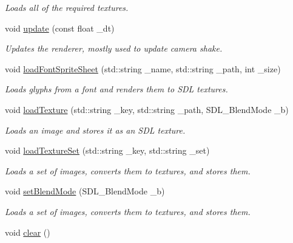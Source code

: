 \begin{DoxyCompactItemize}
\begin{DoxyCompactList}\small\item\em Loads all of the required textures. \end{DoxyCompactList}\item 
void \hyperlink{classrenderer_ad06ba9c15401bb0dcdafb525cfd8f201}{update} (const float \-\_\-dt)
\begin{DoxyCompactList}\small\item\em Updates the renderer, mostly used to update camera shake. \end{DoxyCompactList}\item 
void \hyperlink{classrenderer_abab0176fc41988510f7602da75e885fc}{load\-Font\-Sprite\-Sheet} (std\-::string \-\_\-name, std\-::string \-\_\-path, int \-\_\-size)
\begin{DoxyCompactList}\small\item\em Loads glyphs from a font and renders them to S\-D\-L textures. \end{DoxyCompactList}\item 
void \hyperlink{classrenderer_a56924d177465861dc6273e6ff5de220d}{load\-Texture} (std\-::string \-\_\-key, std\-::string \-\_\-path, S\-D\-L\-\_\-\-Blend\-Mode \-\_\-b)
\begin{DoxyCompactList}\small\item\em Loads an image and stores it as an S\-D\-L texture. \end{DoxyCompactList}\item 
void \hyperlink{classrenderer_acc26e337a27867cfc52193774986ff7c}{load\-Texture\-Set} (std\-::string \-\_\-key, std\-::string \-\_\-set)
\begin{DoxyCompactList}\small\item\em Loads a set of images, converts them to textures, and stores them. \end{DoxyCompactList}\item 
void \hyperlink{classrenderer_a9355f220b4ea6a7a528913b6878bded2}{set\-Blend\-Mode} (S\-D\-L\-\_\-\-Blend\-Mode \-\_\-b)
\begin{DoxyCompactList}\small\item\em Loads a set of images, converts them to textures, and stores them. \end{DoxyCompactList}\item 
\hypertarget{classrenderer_aab9e421ec4b4fa5a1ce6ebe4dfa9b22c}{void \hyperlink{classrenderer_aab9e421ec4b4fa5a1ce6ebe4dfa9b22c}{clear} ()}\label{classrenderer_aab9e421ec4b4fa5a1ce6ebe4dfa9b22c}


\end{DoxyCompactItemize}
